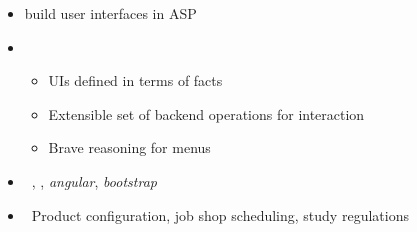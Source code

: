 \begin{frame}{\clinguin}
  \begin{itemize}
    \item {} build user interfaces in ASP
    \item {}
      \begin{itemize}
      \item UIs defined in terms of facts
      \item Extensible set of backend operations for interaction
      \item Brave reasoning for menus
      \end{itemize}
    \item {} \ \clingo, \clorm, \textit{angular}, \textit{bootstrap}
    \item {} \ Product configuration, job shop scheduling, study regulations
  \end{itemize}
\end{frame}
%
